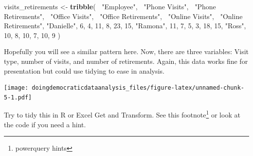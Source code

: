 \documentclass[
]{book}
\newenvironment{Shaded}{\begin{snugshade}}{\end{snugshade}}
\newcommand{\DataTypeTok}[1]{\textcolor[rgb]{0.13,0.29,0.53}{#1}}
\newcommand{\DecValTok}[1]{\textcolor[rgb]{0.00,0.00,0.81}{#1}}
\newcommand{\KeywordTok}[1]{\textcolor[rgb]{0.13,0.29,0.53}{\textbf{#1}}}
\newcommand{\NormalTok}[1]{#1}
\newcommand{\OperatorTok}[1]{\textcolor[rgb]{0.81,0.36,0.00}{\textbf{#1}}}
\newcommand{\OtherTok}[1]{\textcolor[rgb]{0.56,0.35,0.01}{#1}}
\newcommand{\StringTok}[1]{\textcolor[rgb]{0.31,0.60,0.02}{#1}}
\begin{document}
\begin{Shaded}
\begin{Highlighting}[]
\NormalTok{visits_retirements <-}\StringTok{ }\KeywordTok{tribble}\NormalTok{(}
  \OperatorTok{~}\StringTok{"Employee"}\NormalTok{, }\OperatorTok{~}\StringTok{"Phone Visits"}\NormalTok{, }\OperatorTok{~}\StringTok{"Phone Retirements"}\NormalTok{, }\OperatorTok{~}\StringTok{"Office Visits"}\NormalTok{, }\OperatorTok{~}\StringTok{"Office Retirements"}\NormalTok{, }\OperatorTok{~}\StringTok{"Online Visits"}\NormalTok{, }\OperatorTok{~}\StringTok{"Online Retirements"}\NormalTok{,}
  \StringTok{"Danielle"}\NormalTok{, }\DecValTok{6}\NormalTok{, }\DecValTok{4}\NormalTok{, }\DecValTok{11}\NormalTok{, }\DecValTok{8}\NormalTok{, }\DecValTok{23}\NormalTok{, }\DecValTok{15}\NormalTok{,}
  \StringTok{"Ramona"}\NormalTok{, }\DecValTok{11}\NormalTok{, }\DecValTok{7}\NormalTok{, }\DecValTok{5}\NormalTok{, }\DecValTok{3}\NormalTok{, }\DecValTok{18}\NormalTok{, }\DecValTok{15}\NormalTok{,}
  \StringTok{"Ross"}\NormalTok{, }\DecValTok{10}\NormalTok{, }\DecValTok{8}\NormalTok{, }\DecValTok{10}\NormalTok{, }\DecValTok{7}\NormalTok{, }\DecValTok{10}\NormalTok{, }\DecValTok{9} 
\NormalTok{)}
\end{Highlighting}
\end{Shaded}

Hopefully you will see a similar pattern here. Now, there are three variables: Visit type, number of visits, and number of retirements. Again, this data works fine for presentation but could use tidying to ease in analysis.

\begin{Shaded}
\end{Shaded}

\texttt{[image: doingdemocraticdataanalysis\_files/figure-latex/unnamed-chunk-5-1.pdf]}

Try to tidy this in R or Excel Get and Transform. See this footnote\footnote{powerquery hints} or look at the code if you need a hint.
\end{document}
